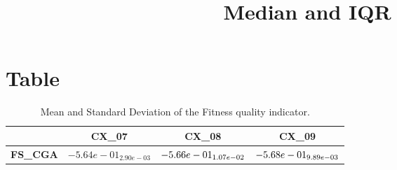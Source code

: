 \documentclass{article}
\title{Median and IQR}
\author{}
\begin{document}
\maketitle
\section{Table}
\begin{table}[!htp]
  \caption{Mean and Standard Deviation of the Fitness quality indicator.}
  \label{table:Fitness}
  \centering
  \begin{scriptsize}
  \begin{tabular}{c|ccc}
      & \textbf{CX\_07} & \textbf{CX\_08} & \textbf{CX\_09} \\\hline
      \textbf{FS_CGA} & $-5.64e-01_{2.90e-03} $ & $ \cellcolor{gray95} -5.66e-01_{1.07e-02} $ & $ \cellcolor{gray25} -5.68e-01_{9.89e-03}$ \\
  \end{tabular}
  \end{scriptsize}
\end{table}
\end{document}
